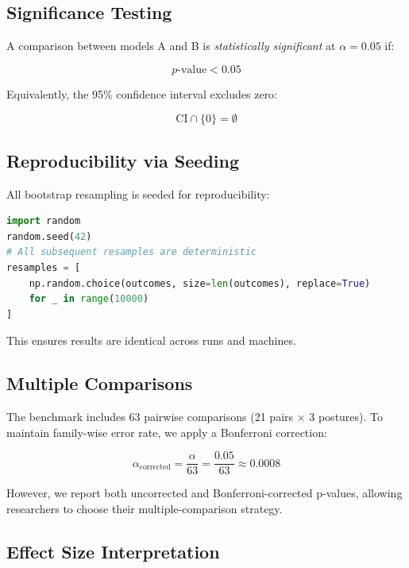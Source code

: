 \subsection{Significance Testing}

A comparison between models A and B is \textit{statistically significant} at $\alpha = 0.05$ if:

\begin{equation}
p\text{-value} < 0.05
\end{equation}

Equivalently, the 95\% confidence interval excludes zero:

\begin{equation}
\text{CI} \cap \{0\} = \emptyset
\end{equation}

\subsection{Reproducibility via Seeding}

All bootstrap resampling is seeded for reproducibility:

\begin{lstlisting}[language=Python]
import random
random.seed(42)
# All subsequent resamples are deterministic
resamples = [
    np.random.choice(outcomes, size=len(outcomes), replace=True)
    for _ in range(10000)
]
\end{lstlisting}

This ensures results are identical across runs and machines.

\subsection{Multiple Comparisons}

The benchmark includes 63 pairwise comparisons (21 pairs $\times$ 3 postures). To maintain family-wise error rate, we apply a Bonferroni correction:

\begin{equation}
\alpha_{\text{corrected}} = \frac{\alpha}{63} = \frac{0.05}{63} \approx 0.0008
\end{equation}

However, we report both uncorrected and Bonferroni-corrected p-values, allowing researchers to choose their multiple-comparison strategy.

\subsection{Effect Size Interpretation}


